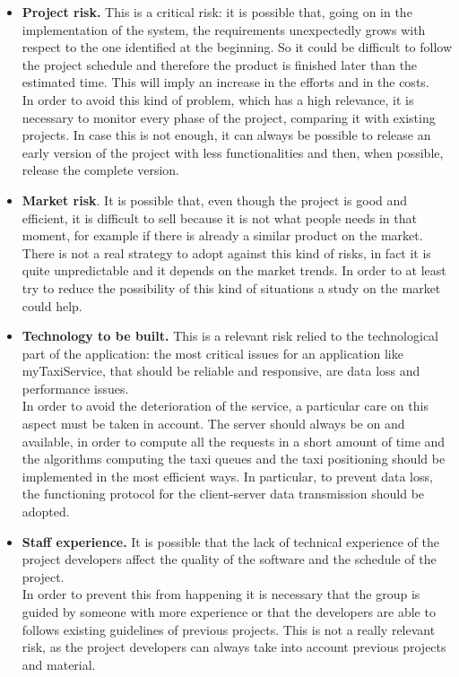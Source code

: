 	\begin{itemize}
		\item \textbf{Project risk.} This is a critical risk: it is possible that, going on in the implementation of the system, the requirements unexpectedly grows with respect to the one identified at the beginning. So it could be difficult to follow the project schedule and therefore the product is finished later than the estimated time. This will imply an increase in the efforts and in the costs.\\ In order to avoid this kind of problem, which has a high relevance, it is necessary to monitor every phase of the project, comparing it with existing projects. In case this is not enough, it can always be possible to release an early version of the project with less functionalities and then, when possible, release the complete version.
		\item \textbf{Market risk}. It is possible that, even though the project is good and efficient, it is difficult to sell because it is not what people needs in that moment, for example if there is already a similar product on the market.\\ There is not a real strategy to adopt against this kind of risks, in fact it is quite unpredictable and it depends on the market trends. In order to at least try to reduce the possibility of this kind of situations a study on the market could help.
		\item \textbf{Technology to be built.} This is a relevant risk relied to the technological part of the application: the most critical issues for an application like myTaxiService, that should be reliable and responsive, are data loss and performance issues.\\ In order to avoid the deterioration of the service, a particular care on this aspect must be taken in account. The server should always be on and available, in order to compute all the requests in a short amount of time and the algorithms computing the taxi queues and the taxi positioning should be implemented in the most efficient ways. In particular, to prevent data loss, the functioning protocol for the client-server data transmission should be adopted.
		\item \textbf{Staff experience.} It is possible that the lack of technical experience of the project developers affect the quality of the software and the schedule of the project.\\ In order to prevent this from happening it is necessary that the group is guided by someone with more experience or that the developers are able to follows existing guidelines of previous projects. This is not a really relevant risk, as the project developers can always take into account previous projects and material.
	\end{itemize}